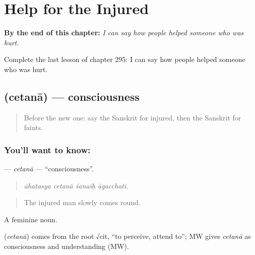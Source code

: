 
\chapter{Help for the Injured}
\label{ch:sa-help-for-the-injured}

\begin{chapteropening}
\textbf{By the end of this chapter:} \emph{I can say how people helped someone who was hurt.}

Complete the last lesson of chapter 295: I can say how people helped someone who was hurt.
\end{chapteropening}

\section[\texorpdfstring{\sk{चेतना} (cetanā)}{चेतना (cetanā)}]{ (cetanā) — consciousness}

\label{lesson:SA-C295-cetana}



\begin{quote}
Before the new one: say the Sanskrit for injured, then the Sanskrit for faints.
\end{quote}

\subsection*{You'll want to know: }
\textbf{} — \emph{cetanā} — \textquotedblleft{}consciousness\textquotedblright{}.

\begin{quote}
   
\end{quote}

\begin{quote}
\emph{āhatasya cetanā śanaiḥ āgacchati.}
\end{quote}

\begin{quote}
The injured man slowly comes round.
\end{quote}

A feminine noun.

\begin{cousinweb}
\textbf{} (\emph{cetanā}) comes from the root √cit, \textquotedblleft{}to perceive, attend to\textquotedblright{}; MW gives \emph{cetanā} as consciousness and understanding (MW).
\end{cousinweb}

